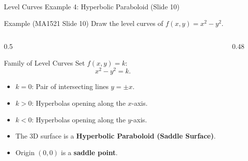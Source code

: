 \documentclass[aspectratio=169,10pt]{beamer}
\begin{document}
\begin{frame}{Level Curves Example 4: Hyperbolic Paraboloid (Slide 10)}
  \begin{exampleblock}{Example (MA1521 Slide 10)}
    Draw the level curves of $f(x, y) = x^2 - y^2$.
  \end{exampleblock}

  \begin{columns}[T]
    \begin{column}{0.5\textwidth}
      \begin{block}{Family of Level Curves}
        \small
        Set $f(x, y) = k$:
        \[
          x^2 - y^2 = k.
        \]
        \begin{itemize}
          \item $k = 0$: Pair of intersecting lines $y = \pm x$.
          \item $k > 0$: Hyperbolas opening along the $x$-axis.
          \item $k < 0$: Hyperbolas opening along the $y$-axis.
          \item The 3D surface is a \textbf{Hyperbolic Paraboloid (Saddle Surface)}.
          \item Origin $(0, 0)$ is a \textbf{saddle point}.
        \end{itemize}
      \end{block}
    \end{column}

    \begin{column}{0.48\textwidth}
      \centering
    \end{column}
  \end{columns}
\end{frame}
\end{document}
